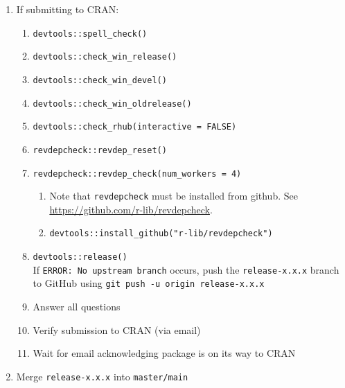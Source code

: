 \documentclass{article}
\begin{document}
\begin{enumerate}

  \item If submitting to CRAN:

	\begin{enumerate}

	  \item \verb+devtools::spell_check()+

	  \item \verb+devtools::check_win_release()+

	  \item \verb+devtools::check_win_devel()+

      \item \verb+devtools::check_win_oldrelease()+

	  \item \verb+devtools::check_rhub(interactive = FALSE)+

	  \item \verb+revdepcheck::revdep_reset()+

      \item \verb+revdepcheck::revdep_check(num_workers = 4)+
      \begin{enumerate}

        \item Note that \texttt{revdepcheck} must be installed from github.
              See \url{https://github.com/r-lib/revdepcheck}.

	    \item \verb+devtools::install_github("r-lib/revdepcheck")+

      \end{enumerate}

	  \item \verb+devtools::release()+ \\
            If \texttt{ERROR: No upstream branch} occurs,
            push the \texttt{release-x.x.x} branch to GitHub using
            \texttt{git push -u origin release-x.x.x}

      \item Answer all questions

      \item Verify submission to CRAN (via email)

	  \item Wait for email acknowledging package is on its way to CRAN

	\end{enumerate}
  \item Merge \texttt{release-x.x.x} into \texttt{master/main}
  \begin{enumerate}


\end{enumerate}
\end{enumerate}
\end{document}
